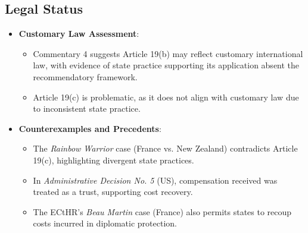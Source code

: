 \subsection{Legal Status}
\begin{itemize}
    \item \textbf{Customary Law Assessment}:
    \begin{itemize}
        \item Commentary 4 suggests Article 19(b) may reflect customary international law, with evidence of state practice supporting its application absent the recommendatory framework.
        \item Article 19(c) is problematic, as it does not align with customary law due to inconsistent state practice.
    \end{itemize}
    \item \textbf{Counterexamples and Precedents}:
    \begin{itemize}
        \item The \textit{Rainbow Warrior} case (France vs. New Zealand) contradicts Article 19(c), highlighting divergent state practices.
        \item In \textit{Administrative Decision No. 5} (US), compensation received was treated as a trust, supporting cost recovery.
        \item The ECtHR’s \textit{Beau Martin} case (France) also permits states to recoup costs incurred in diplomatic protection.
    \end{itemize}
\end{itemize}

